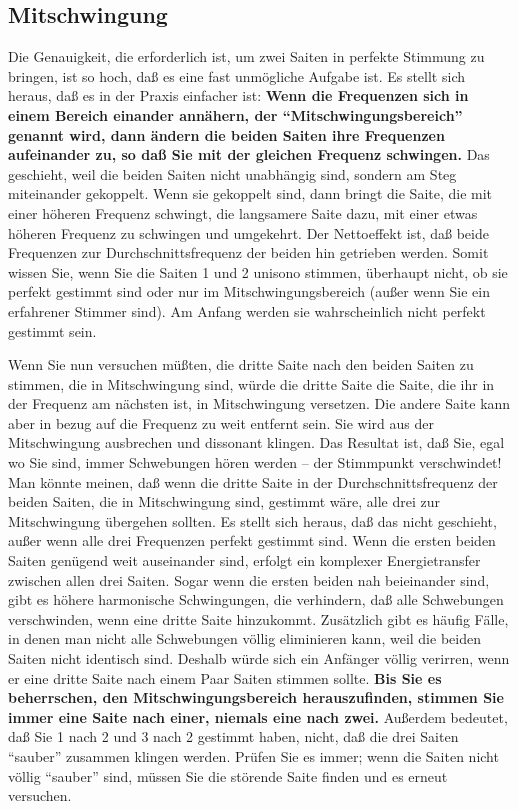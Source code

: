 
\label{c2_5e}
\subsection{Mitschwingung}
\label{c2_5_mits} 

Die Genauigkeit, die erforderlich ist, um zwei Saiten in perfekte Stimmung zu bringen, ist so hoch, daß es eine fast unmögliche Aufgabe ist.
Es stellt sich heraus, daß es in der Praxis einfacher ist: \textbf{Wenn die Frequenzen sich in einem Bereich einander annähern, der \enquote{Mitschwingungsbereich} genannt wird, dann ändern die beiden Saiten ihre Frequenzen aufeinander zu, so daß Sie mit der gleichen Frequenz schwingen.}
Das geschieht, weil die beiden Saiten nicht unabhängig sind, sondern am Steg miteinander gekoppelt.
Wenn sie gekoppelt sind, dann bringt die Saite, die mit einer höheren Frequenz schwingt, die langsamere Saite dazu, mit einer etwas höheren Frequenz zu schwingen und umgekehrt.
Der Nettoeffekt ist, daß beide Frequenzen zur Durchschnittsfrequenz der beiden hin getrieben werden.
Somit wissen Sie, wenn Sie die Saiten 1 und 2 unisono stimmen, überhaupt nicht, ob sie perfekt gestimmt sind oder nur im Mitschwingungsbereich (außer wenn Sie ein erfahrener Stimmer sind).
Am Anfang werden sie wahrscheinlich nicht perfekt gestimmt sein.

Wenn Sie nun versuchen müßten, die dritte Saite nach den beiden Saiten zu stimmen, die in Mitschwingung sind, würde die dritte Saite die Saite, die ihr in der Frequenz am nächsten ist, in Mitschwingung versetzen.
Die andere Saite kann aber in bezug auf die Frequenz zu weit entfernt sein.
Sie wird aus der Mitschwingung ausbrechen und dissonant klingen.
Das Resultat ist, daß Sie, egal wo Sie sind, immer Schwebungen hören werden -- der Stimmpunkt verschwindet!
Man könnte meinen, daß wenn die dritte Saite in der Durchschnittsfrequenz der beiden Saiten, die in Mitschwingung sind, gestimmt wäre, alle drei zur Mitschwingung übergehen sollten.
Es stellt sich heraus, daß das nicht geschieht, außer wenn alle drei Frequenzen perfekt gestimmt sind.
Wenn die ersten beiden Saiten genügend weit auseinander sind, erfolgt ein komplexer Energietransfer zwischen allen drei Saiten.
Sogar wenn die ersten beiden nah beieinander sind, gibt es höhere harmonische Schwingungen, die verhindern, daß alle Schwebungen verschwinden, wenn eine dritte Saite hinzukommt.
Zusätzlich gibt es häufig Fälle, in denen man nicht alle Schwebungen völlig eliminieren kann, weil die beiden Saiten nicht identisch sind.
Deshalb würde sich ein Anfänger völlig verirren, wenn er eine dritte Saite nach einem Paar Saiten stimmen sollte.
\textbf{Bis Sie es beherrschen, den Mitschwingungsbereich herauszufinden, stimmen Sie immer eine Saite nach einer, niemals eine nach zwei.}
Außerdem bedeutet, daß Sie 1 nach 2 und 3 nach 2 gestimmt haben, nicht, daß die drei Saiten \enquote{sauber} zusammen klingen werden.
Prüfen Sie es immer; wenn die Saiten nicht völlig \enquote{sauber} sind, müssen Sie die störende Saite finden und es erneut versuchen.

